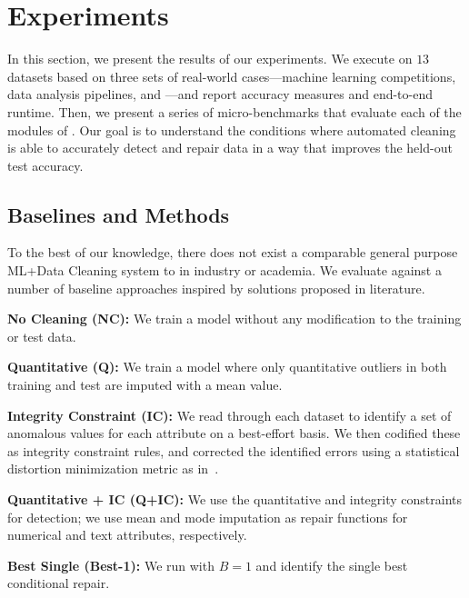 \section{Experiments}\label{s:exp}
In this section, we present the results of our experiments.  We execute \sys on $13$ datasets based on three sets of real-world cases---machine learning competitions, data analysis pipelines, and \company---and report accuracy measures and end-to-end runtime.  Then, we present a series of micro-benchmarks that evaluate each of the modules of \sys.  Our goal is to understand the conditions where automated cleaning is able to accurately detect and repair data in a way that improves the held-out test accuracy.

\subsection{Baselines and Methods}
To the best of our knowledge, there does not exist a comparable general purpose ML+Data Cleaning system to \sys in industry or academia.
We evaluate \sys against a number of baseline approaches inspired by solutions proposed in literature. 

\vspace{0.25em}\noindent\textbf{No Cleaning (NC): } We train a model without any modification to the training or test data.

\vspace{0.25em}\noindent\textbf{Quantitative (Q): } We train a model where only quantitative outliers in both training and test are imputed with a mean value.  

\vspace{0.25em}\noindent\textbf{Integrity Constraint (IC): } We read through each dataset to identify a set of anomalous values for each attribute on a best-effort basis.  We then codified these as integrity constraint rules, and corrected the identified errors using a statistical distortion minimization metric as in~\cite{prokoshyna2015combining}.

\vspace{0.25em}\noindent\textbf{Quantitative + IC (Q+IC): } We use the quantitative and integrity constraints for detection; we use mean and mode imputation as repair functions for numerical and text attributes, respectively.

\vspace{0.25em}\noindent\textbf{Best Single (Best-1): } We run \sys with $B=1$ and identify the  single best conditional repair.

